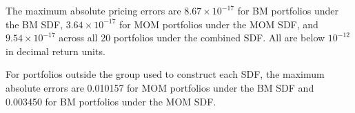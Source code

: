 The maximum absolute pricing errors are $8.67\times 10^{-17}$ for BM portfolios under the BM SDF, $3.64\times 10^{-17}$ for MOM portfolios under the MOM SDF, and $9.54\times 10^{-17}$ across all 20 portfolios under the combined SDF. All are below $10^{-12}$ in decimal return units.

For portfolios outside the group used to construct each SDF, the maximum absolute errors are 0.010157 for MOM portfolios under the BM SDF and 0.003450 for BM portfolios under the MOM SDF.
